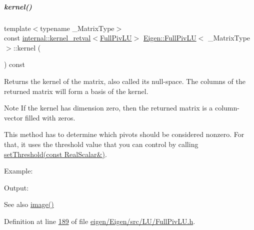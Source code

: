 \mbox{\label{group___l_u___module_a70f52eeb2cd07dfbf790fce106fb4015}} 
\subparagraph{\texorpdfstring{kernel()}{kernel()}\hspace{0.1cm}{\footnotesize\ttfamily [2/2]}}
{\footnotesize\ttfamily template$<$typename \+\_\+\+Matrix\+Type$>$ \\
const \hyperlink{struct_eigen_1_1internal_1_1kernel__retval}{internal\+::kernel\+\_\+retval}$<$\hyperlink{group___l_u___module_class_eigen_1_1_full_piv_l_u}{Full\+Piv\+LU}$>$ \hyperlink{group___l_u___module_class_eigen_1_1_full_piv_l_u}{Eigen\+::\+Full\+Piv\+LU}$<$ \+\_\+\+Matrix\+Type $>$\+::kernel (\begin{DoxyParamCaption}{ }\end{DoxyParamCaption}) const\hspace{0.3cm}{\ttfamily [inline]}}

\begin{DoxyReturn}{Returns}
the kernel of the matrix, also called its null-\/space. The columns of the returned matrix will form a basis of the kernel.
\end{DoxyReturn}
\begin{DoxyNote}{Note}
If the kernel has dimension zero, then the returned matrix is a column-\/vector filled with zeros.

This method has to determine which pivots should be considered nonzero. For that, it uses the threshold value that you can control by calling \hyperlink{group___l_u___module_a414592d82de98f5bd075965caf56d681}{set\+Threshold(const Real\+Scalar\&)}.
\end{DoxyNote}
Example\+: 
\begin{DoxyCodeInclude}
\end{DoxyCodeInclude}
 Output\+: 
\begin{DoxyVerbInclude}
\end{DoxyVerbInclude}


\begin{DoxySeeAlso}{See also}
\hyperlink{group___l_u___module_a0893985d2dab367baa6e57c6fd0c4956}{image()} 
\end{DoxySeeAlso}


Definition at line \hyperlink{eigen_2_eigen_2src_2_l_u_2_full_piv_l_u_8h_source_l00189}{189} of file \hyperlink{eigen_2_eigen_2src_2_l_u_2_full_piv_l_u_8h_source}{eigen/\+Eigen/src/\+L\+U/\+Full\+Piv\+L\+U.\+h}.


